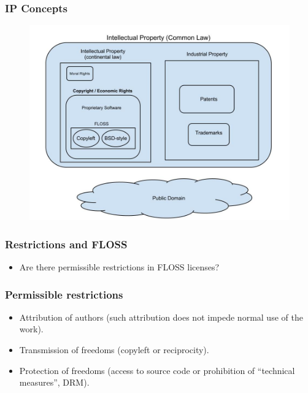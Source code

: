 \documentclass{beamer}
\begin{document}

\begin{frame}
\frametitle{IP Concepts}

\begin{figure}
\vspace{-0.4cm}
\begin{center}
	\includegraphics[scale=0.28,clip=true]{figs/IP_venn_diagram.jpg}
\end{center}
\end{figure}

\end{frame}

\begin{frame}
\frametitle{Restrictions and FLOSS}
\large
\begin{itemize}
    \item Are there permissible restrictions in FLOSS licenses? 
\end{itemize}

\end{frame}



\begin{frame}
\frametitle{Permissible restrictions}
\begin{itemize}
    \item Attribution of authors (such attribution does not impede normal use of the work).
    \item Transmission of freedoms (copyleft or reciprocity).
    \item Protection of freedoms (access to source code or prohibition of ``technical measures'', DRM). 
\end{itemize}

\end{frame}
\end{document}
